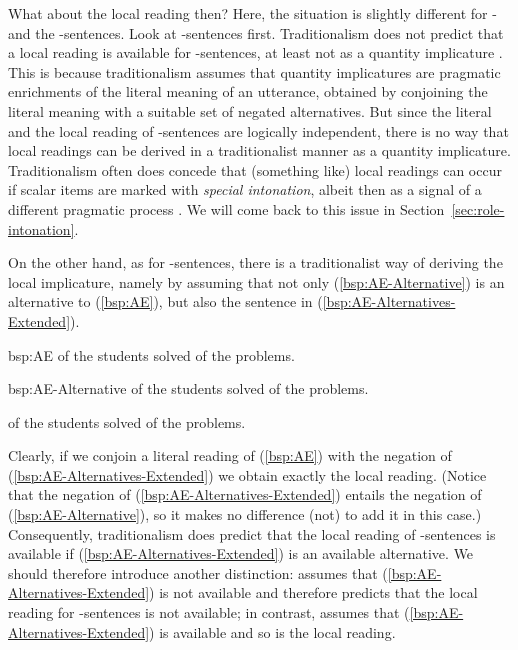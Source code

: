 \documentclass[fleqn,reqno,10pt,draft]{article}
\newcommand{\as}{\acro{as}}
\renewcommand{\es}{\acro{es}}
\begin{document}
What about the local reading then? Here, the situation is slightly
different for \as- and the \es-sentences. Look at \es-sentences
first. Traditionalism does not predict that a local reading is
available for \es-sentences, at least not as a quantity implicature
\citep[c.f.][]{GeurtsPouscoulous2009:Embedded-Implic,ChemlaSpector2010:Experimental-Ev}. This
is because traditionalism assumes that quantity implicatures are
pragmatic enrichments of the literal meaning of an utterance, obtained
by conjoining the literal meaning with a suitable set of negated
alternatives. But since the literal and the local reading of
\es-sentences are logically independent, there is no way that local
readings can be derived in a traditionalist manner as a quantity
implicature. Traditionalism often does concede that (something like)
local readings can occur if scalar items are marked with \emph{special
  intonation}, albeit then as a signal of a different pragmatic
process
\citep[e.g.][]{Horn2006:The-Border-Wars,Geurts2009:Scalar-Implicat,Geurts2010:Quantity-Implic}. We
will come back to this issue in Section~\ref{sec:role-intonation}.

On the other hand, as for \as-sentences, there is a traditionalist way
of deriving the local implicature, namely by assuming that not only
(\ref{bsp:AE-Alternative}) is an alternative to (\ref{bsp:AE}), but
also the sentence in (\ref{bsp:AE-Alternatives-Extended}).

\begin{exer}{bsp:AE}
  \ex {} of the students solved  of the problems.
\end{exer}

\begin{exer}{bsp:AE-Alternative}
  \ex {} of the students solved  of the problems.
\end{exer}

\begin{exe}
\ex \label{bsp:AE-Alternatives-Extended}  of the students solved  of the problems.
\end{exe}

\noindent Clearly, if we conjoin a literal reading of (\ref{bsp:AE})
with the negation of (\ref{bsp:AE-Alternatives-Extended}) we obtain
exactly the local reading. (Notice that the negation of
(\ref{bsp:AE-Alternatives-Extended}) entails the negation of
(\ref{bsp:AE-Alternative}), so it makes no difference (not) to add it
in this case.) Consequently, traditionalism does predict that the
local reading of \as-sentences is available if
(\ref{bsp:AE-Alternatives-Extended}) is an available alternative. We
should therefore introduce another distinction:  assumes that (\ref{bsp:AE-Alternatives-Extended}) is
not available and therefore predicts that the local reading for
\as-sentences is not available; in contrast,  assumes that (\ref{bsp:AE-Alternatives-Extended}) is
available and so is the local reading.
\end{document}
